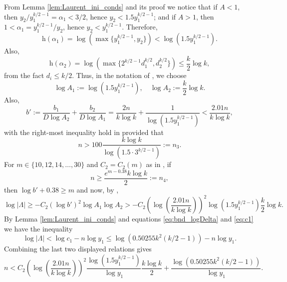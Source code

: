 \documentclass[12pt]{amsart}
\numberwithin{equation}{section}
\theoremstyle{definition}
\theoremstyle{remark}
\newcommand{\h}{\mathrm{h}}
\begin{document}
From Lemma \ref{lem:Laurent_ini_conds} and its proof we notice that if $A<1$, then $y_2/y_1^{k/2-1}=\alpha_1 < 3/2$, hence $y_2 < 1.5y_1^{k/2-1}$; and if $A>1$, then $1 < \alpha_1=y_1^{k/2-1}/y_2$, hence $y_2<y_1^{k/2-1}$.
Therefore, 
\begin{equation*}
\h(\alpha_1)=\log\left(\max\{y_1^{k/2-1},y_2\}\right)<\log(1.5y_1^{k/2-1}).
\end{equation*}
Also, 
\begin{equation*}
\h(\alpha_2)=\log\left(\max\{2^{k/2-1}d_1^{k/2},d_2^{k/2}\}\right)\leq \frac{k}{2}\log k,
\end{equation*}
from the fact $d_i\leq k/2$. Thus, in the notation of \cite[Corollary 2]{Laurent08}, we choose
\begin{equation*}
  \log A_1:=\log\left(1.5y_1^{k/2-1}\right), \quad \log A_2:=\frac{k}{2}\log k.
\end{equation*}
Also,
\begin{equation*}
b':=\frac{b_1}{D\log A_2} + \frac{b_2}{D\log A_1} =
\frac{2n}{k\log k} +\frac{1}{\log(1.5y_1^{k/2-1})} 
<\frac{2.01n}{k\log k},
\end{equation*}
with the right-most inequality hold in provided that 
\begin{equation*}
n>100\frac{k\log k}{\log\left(1.5\cdot 3^{k/2-1}\right)}:=n_3.
\end{equation*}
For $m\in\{10,12,14,\ldots,30\}$ and $C_2=C_2(m)$ as in 
\cite[Table 1]{Laurent08}, if 
\begin{equation} \label{eq:lb_n_Laurent_cond}
    n\ge \frac{e^{m-0.38}k\log k}{2}:=n_4,
\end{equation}
then $\log b'+0.38 \ge m$ and now, by \cite[Corollary 2]{Laurent08},
\begin{equation*}
    \log|\Lambda|\ge -C_2(\log b')^2\log A_1\log A_2
    > -C_2\left(\log\left(\frac{2.01n}{k\log k}\right)\right)^2
    \log\left(1.5y_1^{k/2-1}\right)\frac{k}{2}\log k.
\end{equation*}
By Lemma \ref{lem:Laurent_ini_conds} and equations \eqref{eq:bnd_logDelta} and \eqref{eq:c1} we have the inequality
\begin{equation*}
    \log|\Lambda|<\log c_1 -n\log y_1 
    \le \log\left(0.50255k^2(k/2-1)\right)-n\log y_1.
\end{equation*}
%
Combining the last two displayed relations gives
\begin{equation*}
 n < C_2\left(\log\left(\frac{2.01n}{k\log k}\right)\right)^2
\frac{\log(1.5y_1^{k/2-1})}{\log y_1}\frac{k\log k}{2} +
\frac{\log\left(0.50255k^2(k/2-1)\right)}{\log y_1}.
\end{equation*}
\end{document}
